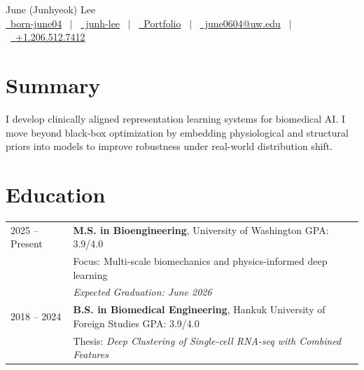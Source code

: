 \documentclass[a4paper,10pt]{article}
\begin{document}
\pagestyle{empty} 

\begin{center}
\LARGE{June (Junhyeok) Lee}\\[7.5pt]
\normalsize{
\href{https://github.com/born-june04}{\raisebox{-0.05\height}\faGithub\ born-june04} \ $|$ \ 
\href{https://linkedin.com/in/junh-lee/}{\raisebox{-0.05\height}\faLinkedin\ junh-lee} \ $|$ \ 
\href{https://born-june04.github.io/}{\raisebox{-0.05\height}\faGlobe \ Portfolio} \ $|$ \ 
\href{mailto:june0604@uw.edu}{\raisebox{-0.05\height}\faEnvelope \ june0604@uw.edu} \ $|$ \ 
\href{tel:+12065127412}{\raisebox{-0.05\height}\faMobile \ +1.206.512.7412}
}\\[5pt]
\end{center}

\section{Summary}
I develop clinically aligned representation learning systems for biomedical AI. I move beyond black-box optimization by embedding physiological and structural priors into models to improve robustness under real-world distribution shift.


\section{Education}
\begin{tabularx}{\linewidth}{@{}l X@{}}
2025 -- Present & \textbf{M.S. in Bioengineering}, University of Washington \hfill GPA: 3.9/4.0 \\
& Focus: Multi-scale biomechanics and physics-informed deep learning \\
& \textit{Expected Graduation: June 2026} \\[4pt]

2018 -- 2024 & \textbf{B.S. in Biomedical Engineering}, Hankuk University of Foreign Studies \hfill GPA: 3.9/4.0 \\
& Thesis: \textit{Deep Clustering of Single-cell RNA-seq with Combined Features} \\
\end{tabularx}
\end{document}
